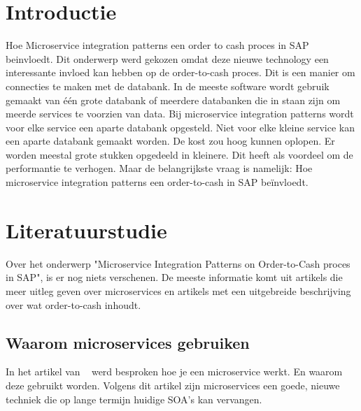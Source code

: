 
\section{Introductie} %
\label{sec:introductie}

Hoe Microservice integration patterns een order to cash proces in SAP beinvloedt. Dit onderwerp werd gekozen omdat deze nieuwe technology een interessante invloed kan hebben op de order-to-cash proces. Dit is een manier om connecties te maken met de databank. In de meeste software wordt gebruik gemaakt van één grote databank of meerdere databanken die in staan zijn om meerde services te voorzien van data. Bij microservice integration patterns wordt voor elke service een aparte databank opgesteld. Niet voor elke kleine service kan een aparte databank gemaakt worden. De kost zou hoog kunnen oplopen. Er worden meestal grote stukken opgedeeld in kleinere. Dit heeft als voordeel om de performantie te verhogen. Maar de belangrijkste vraag is namelijk: Hoe microservice integration patterns een order-to-cash in SAP beïnvloedt.


\section{Literatuurstudie}
\label{sec:state-of-the-art}

Over het onderwerp "Microservice Integration Patterns on Order-to-Cash proces in SAP", is er nog niets verschenen. De meeste informatie komt uit artikels die meer uitleg geven over microservices en artikels met een uitgebreide beschrijving over wat order-to-cash inhoudt.

\subsection{Waarom microservices gebruiken} 
In het artikel van ~\cite{Gunaratne2017} werd besproken hoe je een microservice werkt. En waarom deze gebruikt worden. Volgens dit artikel zijn microservices een goede, nieuwe techniek die op lange termijn huidige SOA's kan vervangen. 

